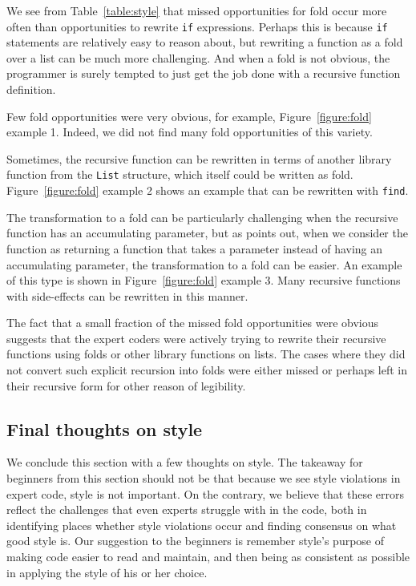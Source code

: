 \documentclass[12pt,abstracton]{scrartcl}
\begin{document}
We see from Table~\ref{table:style} that missed opportunities for fold occur more often
than opportunities to rewrite \texttt{if} expressions. Perhaps this is
because \texttt{if} statements are relatively easy to reason about, but
rewriting a function as a fold over a list can be much more challenging.
And when a fold is not obvious, the programmer is surely tempted to just
get the job done with a recursive function definition.

Few fold opportunities were very obvious, for example, Figure~\ref{figure:fold} example 1.
Indeed, we did not find many fold opportunities of this variety.

Sometimes, the recursive function can be rewritten in terms of another library function
from the \texttt{List} structure, which itself could be written as fold.
Figure~\ref{figure:fold} example 2 shows an example that can be rewritten with \texttt{find}.

The transformation to a fold can be particularly challenging when the recursive function
has an accumulating parameter, but as \cite{Jeu13} points out,
when we consider the function as returning a function that takes a parameter
instead of having an accumulating parameter, the transformation to a fold
can be easier. An example of this type is shown in Figure~\ref{figure:fold} example 3.
Many recursive functions with side-effects can be rewritten in this manner.

The fact that a small fraction of the missed fold opportunities were obvious
suggests that the expert coders were actively trying to rewrite their
recursive functions using folds or other library functions on lists. The
cases where they did not convert such explicit recursion into folds
were either missed or perhaps left in their recursive form for other
reason of legibility.
\subsection{Final thoughts on style}\label{subsec:stylethoughts}
We conclude this section with a few thoughts on style.
The takeaway for beginners from this section should not be
that because we see style violations in expert code,
style is not important. On the contrary, we believe that
these errors reflect the challenges that even experts
struggle with in the code, both in identifying places
whether style violations occur and finding consensus on
what good style is. Our suggestion to the beginners is
remember style's purpose of making code easier to read
and maintain, and then being as consistent as possible
in applying the style of his or her choice.
\end{document}

